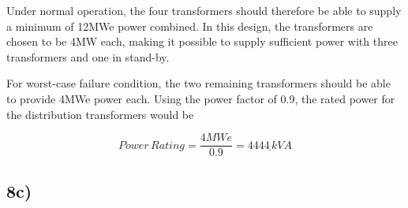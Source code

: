 Under normal operation, the four transformers should therefore be able to supply a minimum of 12MWe power combined. In this design, the transformers are chosen to be 4MW each, making it possible to supply sufficient power with three transformers and one in stand-by. 

For worst-case failure condition, the two remaining transformers should be able to provide 4MWe power each. Using the power factor of 0.9, the rated power for the distribution transformers would be 

\[
Power\, Rating=\frac{4MWe}{0.9}=\underline{4444\,kVA}
\]








\subsection*{8c)}

